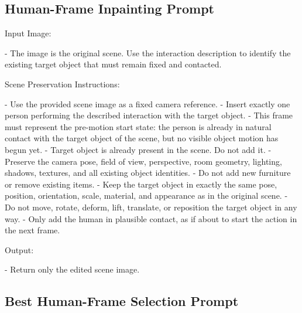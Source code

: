 \subsection{Human-Frame Inpainting Prompt}
\label{app:prompt-human-inpaint}

\begin{promptblock}
Input Image:

- The image is the original scene. Use the interaction description to identify the existing
target object that must remain fixed and contacted.

Scene Preservation Instructions:

- Use the provided scene image as a fixed camera reference.
- Insert exactly one person performing the described interaction with the target object.
- This frame must represent the pre-motion start state: the person is already in natural contact
with the target object of the scene, but no visible object motion has begun yet.
- Target object is already present in the scene. Do not add it.
- Preserve the camera pose, field of view, perspective, room geometry, lighting, shadows, textures,
and all existing object identities.
- Do not add new furniture or remove existing items.
- Keep the target object in exactly the same pose, position, orientation, scale, material,
and appearance as in the original scene.
- Do not move, rotate, deform, lift, translate, or reposition the target object in any way.
- Only add the human in plausible contact, as if about to start the action in the next frame.

Output:

- Return only the edited scene image.
\end{promptblock}

\subsection{Best Human-Frame Selection Prompt}
\label{app:prompt-best-frame-selection}

